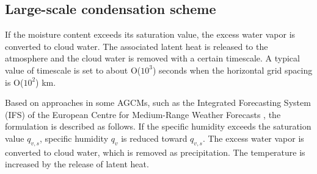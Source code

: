 \subsection{Large-scale condensation scheme}
%
If the moisture content exceeds its saturation value,
the excess water vapor is converted to cloud water.
The associated latent heat is released to the atmosphere 
and the cloud water is removed with a certain timescale.
A typical value of timescale is set to about O($10^3$) seconds when the horizontal grid spacing is O($10^2$) km.

Based on approaches in some AGCMs, such as the Integrated Forecasting System (IFS) of the European Centre for Medium-Range Weather Forecasts \citep{tiedtke1987parametrization}, 
the formulation is described as follows.
If the specific humidity exceeds the saturation value $q_{v,s}$,
specific humidity $q_v$ is reduced toward $q_{v,s}$. 
The excess water vapor is converted to cloud water, which is removed as precipitation.
The temperature is increased by the release of latent heat. 

